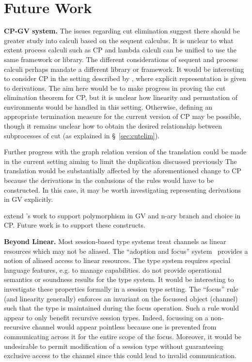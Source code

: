 \section{Future Work}

\textbf{CP-GV system.} The issues regarding cut elimination suggest there
should be greater study into calculi based on the sequent calculus. It is
unclear to what extent process calculi such as CP and lambda calculi can be
unified to use the same framework or library. The different considerations of
sequent and process calculi perhaps mandate a different library or
framework. It would be interesting to consider CP in the setting described by
\citeauthor{Tews:2013,Dawson:2010,Dawson:2002}, where explicit representation
is given to derivations. The aim here would be to make progress in proving the
cut elimination theorem for CP, but it is unclear how linearity and
permutation of environments would be handled in this setting. Otherwise,
defining an appropriate termination measure for the current version of CP may
be possible, though it remains unclear how to obtain the desired relationship
between subprocesses of cut (as explained in \S~\ref{sec:cutelim}).

Further progress with the graph relation version of the translation could be
made in the current setting aiming to limit the duplication discussed
previously The translation would be substantially affected by the
aforementioned change to CP because the derivations in the conlusions of the
rules would have to be constructed. In this case, it may be worth
investigating representing derivations in GV explicitly.

\citeauthor{Lindley:2014:SAP} extend \citeauthor{Wadler:2014}'s work to
support polymorphism in GV and n-ary branch and choice in CP. Future work is
to support these constructs.

\textbf{Beyond Linear.} Most session-based type systems treat channels as
linear resources which may not be aliased. The ``adoption and focus''
system~\cite{Fahndrich:2002} provides a notion of aliased access to linear
resources. The type system requires special language features, e.g. to manage
capabilities. \citeauthor{Fahndrich:2002} do not provide operational semantics
or soundness results for the type system. It would be interesting to
investigate these properties formally in a session type setting. The ``focus''
rule (and linearity generally) enforces an invariant on the focussed object
(channel) such that the type is maintained during the focus operation. Such a
rule would appear to only benefit recursive session types. Indeed, focussing
on a non-recursive channel would appear pointless because one is prevented
from communicating across it for the entire scope of the focus. Moreover, it
would be undesirable to permit modification of a session type without
guaranteeing exclusive access to the channel since this could lead to invalid
communication.

